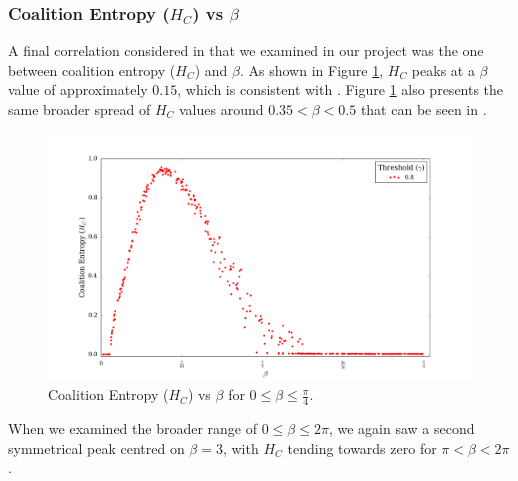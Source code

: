 \documentclass[a4paper,11pt]{article}
\begin{document}
\subsubsection{Coalition Entropy ($H_C$) vs $\beta$}
\label{sec:app:osc:res:hc-v-beta}

A final correlation considered in \cite{Shanahan2010} that we examined in our project was the one between coalition entropy ($H_C$) and $\beta$. As shown in Figure \ref{fig:hc-vs-beta-orig}, $H_C$ peaks at a $\beta$ value of approximately $0.15$, which is consistent with \cite{Shanahan2010}. Figure \ref{fig:hc-vs-beta-orig} also presents the same broader spread of $H_C$ values around $0.35 < \beta < 0.5$ that can be seen in \cite{Shanahan2010}.

\begin{figure}[H]
\begin{center}
\includegraphics[scale = 0.35]{figures/hc_vs_beta_orig}
\caption{
	Coalition Entropy ($H_C$) vs $\beta$ for $0 \leq \beta \leq \frac{\pi}{4}$.
	\label{fig:hc-vs-beta-orig}
}
\end{center}
\end{figure}

When we examined the broader range of $0 \leq \beta \leq 2\pi$, we again saw a second symmetrical peak centred on $\beta = 3$, with $H_C$ tending towards zero for $\pi < \beta< 2\pi$.
\end{document}
